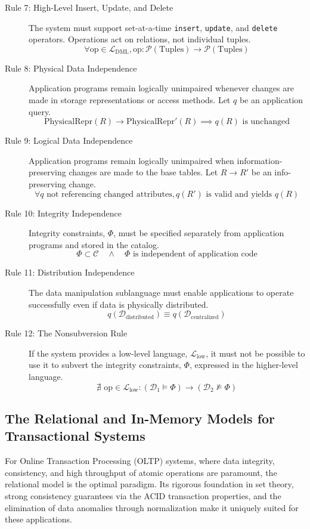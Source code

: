 \begin{description}
    \item[Rule 7: High-Level Insert, Update, and Delete] The system must support set-at-a-time \texttt{insert}, \texttt{update}, and \texttt{delete} operators. Operations act on relations, not individual tuples.
    \[ \forall \text{op} \in \mathcal{L}_{\text{DML}}, \text{op}: \mathcal{P}(\text{Tuples}) \to \mathcal{P}(\text{Tuples}) \]

    \item[Rule 8: Physical Data Independence] Application programs remain logically unimpaired whenever changes are made in storage representations or access methods. Let $q$ be an application query.
    \[ \text{PhysicalRepr}(R) \to \text{PhysicalRepr}'(R) \implies q(R) \text{ is unchanged} \]

    \item[Rule 9: Logical Data Independence] Application programs remain logically unimpaired when information-preserving changes are made to the base tables. Let $R \to R'$ be an info-preserving change.
    \[ \forall q \text{ not referencing changed attributes}, q(R') \text{ is valid and yields } q(R) \]

    \item[Rule 10: Integrity Independence] Integrity constraints, $\Phi$, must be specified separately from application programs and stored in the catalog.
    \[ \Phi \subset \mathcal{C} \quad \land \quad \Phi \text{ is independent of application code} \]

    \item[Rule 11: Distribution Independence] The data manipulation sublanguage must enable applications to operate successfully even if data is physically distributed.
    \[ q(\mathcal{D}_{\text{distributed}}) \equiv q(\mathcal{D}_{\text{centralized}}) \]

    \item[Rule 12: The Nonsubversion Rule] If the system provides a low-level language, $\mathcal{L}_{\text{low}}$, it must not be possible to use it to subvert the integrity constraints, $\Phi$, expressed in the higher-level language.
    \[ \nexists \text{ op} \in \mathcal{L}_{\text{low}} : (\mathcal{D}_1 \models \Phi) \to (\mathcal{D}_2 \not\models \Phi) \]
\end{description}

\subsection{The Relational and In-Memory Models for Transactional Systems}
For Online Transaction Processing (OLTP) systems, where data integrity, consistency, and high throughput of atomic operations are paramount, the relational model is the optimal paradigm. Its rigorous foundation in set theory, strong consistency guarantees via the ACID transaction properties, and the elimination of data anomalies through normalization make it uniquely suited for these applications.

